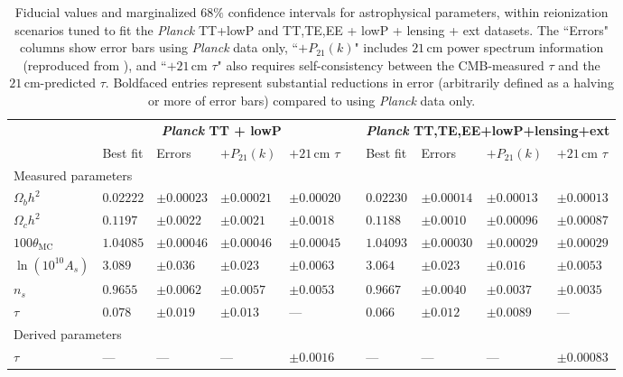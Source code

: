 \documentclass[twocolumn,aps,prd,nofootinbib,showpacs]{revtex4-1}
\begin{document}
\begin{table}
\caption{\label{tab:CosmoParams} Fiducial values and marginalized $68\%$ confidence intervals for astrophysical parameters, within reionization scenarios tuned to fit the \emph{Planck} TT+lowP and TT,TE,EE + lowP + lensing + ext datasets. The ``Errors" columns show error bars using \emph{Planck} data only, ``$+P_{21} (k)$" includes $21\,\textrm{cm}$ power spectrum information (reproduced from \cite{Liu_in_prep}), and ``$+21\,\textrm{cm}$ $\tau$" also requires self-consistency between the CMB-measured $\tau$ and the $21\,\textrm{cm}$-predicted $\tau$. Boldfaced entries represent substantial reductions in error (arbitrarily defined as a halving or more of error bars) compared to using \emph{Planck} data only.}
\begin{ruledtabular}
\begin{tabular}{lllllcllll}
 & \multicolumn{4}{c}{\textbf{\emph{Planck} TT + lowP}} && \multicolumn{4}{l}{\textbf{ \emph{Planck} TT,TE,EE+lowP+lensing+ext}  } \\
 & Best fit & Errors &  $+P_{21} (k)$ &$+21\,\textrm{cm}$ $\tau$&& Best fit & Errors &  $+P_{21} (k)$ &  $+21\,\textrm{cm}$ $\tau$\\
\hline
\multicolumn{7}{l}{Measured parameters} \\
$\Omega_b h^2$ \dotfill & $0.02222 $&$ \pm 0.00023$ & $\pm 0.00021$ &  $\pm 0.00020$ && $0.02230 $&$\pm 0.00014$ & $\pm 0.00013$ &  $\pm 0.00013$ \\
$\Omega_c h^2$ \dotfill & $0.1197$&$ \pm 0.0022$  & $\pm 0.0021$ &  $\pm 0.0018$ && $0.1188$&$ \pm 0.0010$ & $\pm 0.00096$ &  $\pm 0.00087$ \\
$100 \theta_\textrm{MC}$\dotfill  & $1.04085 $&$\pm 0.00046$ & $\pm 0.00046$ &  $\pm 0.00045$ & &$1.04093 $&$\pm 0.00030$ & $\pm 0.00029$ & $\pm 0.00029$ \\
$\ln ( 10^{10} A_s) $ \dotfill & $3.089 $&$\pm 0.036$ & $\pm 0.023$ &  $\mathbf{\pm 0.0063}$ & &$3.064$&$ \pm 0.023$ & $\pm 0.016$ & $\mathbf{\pm 0.0053}$  \\
$ n_s $\dotfill  & $ 0.9655$&$ \pm 0.0062$ & $\pm 0.0057$ &  $\pm 0.0053$ && $0.9667$&$ \pm 0.0040$ & $\pm 0.0037$ &  $\pm 0.0035$ \\
$ \tau $ \dotfill & $0.078 $&$\pm 0.019$ & $\pm 0.013$ &  ---  && $0.066 $&$\pm 0.012$ & $\pm 0.0089$ &  --- \\
\hline
\multicolumn{7}{l}{Derived parameters} \\
$ \tau $\dotfill  & --- & ---  & --- & $ \mathbf{\pm 0.0016}$ &&---  & ---  & ---& $ \mathbf{\pm 0.00083}$ \\

\end{tabular}
\end{ruledtabular}
\end{table}
\end{document}
